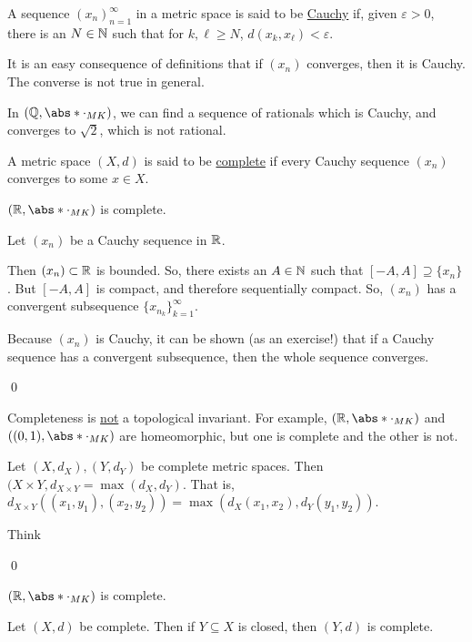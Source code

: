 \documentclass[x11names,reqno,14pt]{extarticle}
\newcommand*{\oo}{{\infty}}
\begin{document}
A sequence $(x_n)_{n=1}^\oo$ in a metric space is said to be \underline{Cauchy} if, given $\varepsilon>0$, there is an $N \in \mathbb{N}$ such that for $k, \ell \geq N$, $d(x_k, x_\ell) < \varepsilon$.

It is an easy consequence of definitions that if $(x_n)$ converges, then it is Cauchy. The converse is not true in general. 

\exm

In $(\Q, \abs*{\cdot}_{MK})$, we can find a sequence of rationals which is Cauchy, and converges to $\sqrt{2}$, which is not rational.


A metric space $(X, d)$ is said to be \underline{complete} if every Cauchy sequence $(x_n)$ converges to some $x \in X$. 

\thm

$(\R,\abs*{\cdot}_{MK})$ is complete. 

\proof

Let $(x_n)$ be a Cauchy sequence in $\mathbb{R}$. 

Then $(x_n) \subset \mathbb{R}$ is bounded. So, there exists an $A \in \mathbb{N}$ such that $[-A, A] \supseteq \{x_n\}$. But $[-A, A]$ is compact, and therefore sequentially compact. So, $(x_n)$ has a convergent subsequence $\{x_{n_k}\}_{k=1}^\oo$. 

Because $(x_n)$ is Cauchy, it can be shown (as an exercise!) that if a Cauchy sequence has a convergent subsequence, then the whole sequence converges. 

\qed

\rem

Completeness is \underline{not} a topological invariant. For example, $(\R, \abs*{\cdot}_{MK})$ and $((0, 1), \abs*{\cdot}_{MK})$ are homeomorphic, but one is complete and the other is not. 

\prop

Let $(X, d_X), (Y, d_Y)$ be complete metric spaces. Then $(X \times Y,d_{X\times Y} = \max(d_X, d_Y)$. That is, $d_{X\times Y}((x_1, y_1), (x_2, y_2)) = \max(d_X(x_1, x_2), d_Y(y_1, y_2))$.

\proof

Think

\qed

\cor

$(\R, \abs*{\cdot}_{MK})$ is complete. 

\thm

Let $(X, d)$ be complete. Then if $Y \subseteq X$ is closed, then $(Y, d)$ is complete. 
\end{document}
